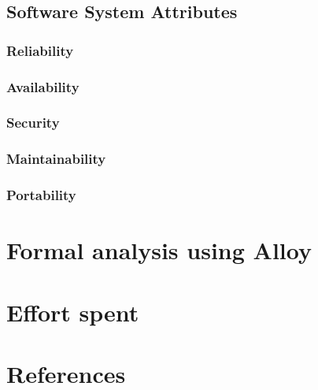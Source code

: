 \documentclass{article}
\begin{document}
	\subsection{Software System Attributes}
	\subsubsection{Reliability}
	\subsubsection{Availability}
	\subsubsection{Security}
	\subsubsection{Maintainability}
	\subsubsection{Portability}
	
	\section{Formal analysis using Alloy}
	
	\section{Effort spent}
	
	\section{References}
	
	
\end{document}
